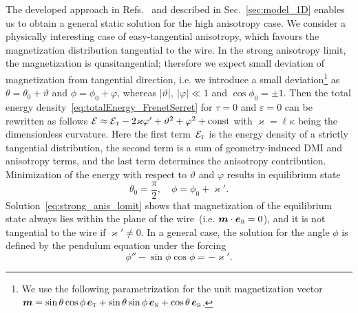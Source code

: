 The developed approach in Refs.~\cite{Sheka15,Volkov18} and described in Sec.~\ref{sec:model_1D} enables us to obtain a general static solution for the high anisotropy case. We consider a physically interesting case of easy-tangential anisotropy, which favours the magnetization distribution tangential to the wire. In the strong anisotropy limit, the magnetization is quasitangential; therefore we expect small deviation of magnetization from tangential direction, i.e. we introduce a small deviation\footnote{We use the following parametrization for the unit magnetization vector $\vec{m}=\sin\theta\cos\phi\,\vec{e}_\textsc{t}+\sin\theta\sin\phi\,\vec{e}_\textsc{n}+\cos\theta\,\vec{e}_\textsc{b}$.} as $\theta=\theta_0+\vartheta$ and $\phi=\phi_0+\varphi$, whereas $|\vartheta|,\ |\varphi|\ll1$ and $\cos\phi_0=\pm1$. Then the total energy density~\eqref{eq:totalEnergy_FrenetSerret} for $\tau=0$ and $\varepsilon = 0$ can be rewritten as follows $\mathcal{E} \approx \mathcal{E}_\textsc{t}-2\varkappa\varphi'+\vartheta^2+\varphi^2+\text{const}$ with $\varkappa=\ell\kappa$ being the dimensionless curvature. Here the first term~$\mathcal{E}_\textsc{t}$ is the energy density of a strictly tangential distribution, the second term is a sum of geometry-induced DMI and anisotropy terms, and the last term determines the anisotropy contribution. Minimization of the energy with respect to $\vartheta$ and $\varphi$ results in equilibrium state
\begin{equation}\label{eq:strong_anis_lomit}
\theta_0=\frac{\pi}{2},\quad \phi=\phi_0+\varkappa'.
\end{equation}
Solution~\eqref{eq:strong_anis_lomit} shows that magnetization of the equilibrium state always lies within the plane of the wire~(i.e. $\vec{m}\cdot\vec{e}_\textsc{b}=0$), and it is not tangential to the wire if $\varkappa'\neq0$. In a general case, the solution for the angle $\phi$ is defined by the pendulum equation under the forcing
\begin{equation}\label{eq:phi_sol}
\phi'' - \sin\phi\cos\phi = -\varkappa'.
\end{equation}

